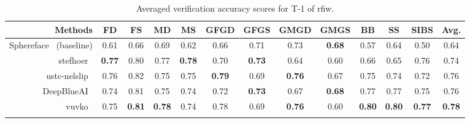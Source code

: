 \documentclass[letterpaper, 10 pt, conference]{ieeeconf}  %
\newcommand{\ie}{\textit{i}.\textit{e}., }
\begin{document}
\begin{table}[t]
\scriptsize
\centering
\caption {Averaged verification accuracy scores for T-1 of \ac{rfiw}.}%
\label{tab:benchmark:track1}
\begin{tabular}{r|cccc|cccc|ccc|c}
  Methods & FD & FS & MD & MS & GFGD & GFGS & GMGD & GMGS & BB & SS & SIBS & Avg. \\

  \midrule
  Sphereface~\cite{Liu_2017_CVPR} (baseline) & 0.61 & 0.66 & 0.69 & 0.62 & 0.66 &0.71& 0.73 & \textbf{0.68} & 0.57 & 0.64 & 0.50 & 0.64\\
    stefhoer~\cite{id2} & \textbf{0.77} & 0.80 & 0.77 & \textbf{0.78} & 0.70 & \textbf{0.73} & 0.64 & 0.60 & 0.66 & 0.65 & 0.76 & 0.74\\
     ustc-nelslip~\cite{id6} & 0.76 & 0.82 & 0.75 & 0.75 & \textbf{0.79} & 0.69 & \textbf{0.76} & 0.67 & 0.75 & 0.74 & 0.72 & 0.76\\
     DeepBlueAI~\cite{id3} & 0.74 & 0.81 & 0.75 & 0.74 & 0.72 & \textbf{0.73} & 0.67 & \textbf{0.68} & 0.77 & 0.77 & 0.75 & 0.76\\
  vuvko~\cite{id4}& 0.75 & \textbf{0.81} & \textbf{0.78} & 0.74 & 0.78 & 0.69 & \textbf{0.76} & 0.60 & \textbf{0.80} & \textbf{0.80} & \textbf{0.77} & \textbf{0.78}\\\vspace{-5mm}
\end{tabular}
\end{table}




\end{document}
